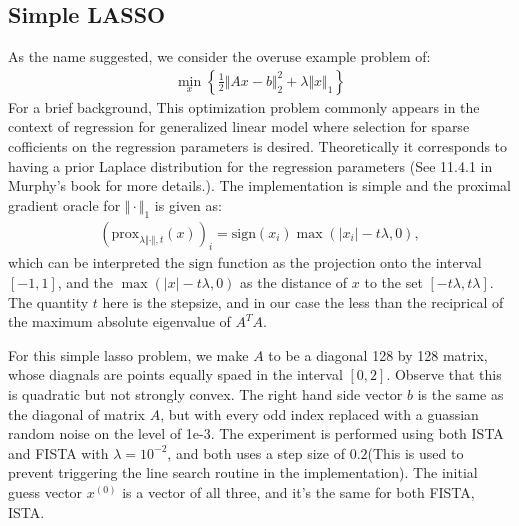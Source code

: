 \documentclass[]{article}
\theoremstyle{definition}
\begin{document}
    \subsection*{Simple LASSO}
        As the name suggested, we consider the overuse example problem of: 
        \begin{align*}
            \min_{x}\left\lbrace
                \frac{1}{2}\Vert Ax - b\Vert^2_2 + \lambda\Vert x\Vert_1    
            \right\rbrace
        \end{align*}
        For a brief background, This optimization problem commonly appears in the context of regression for generalized linear model where selection for sparse cofficients on the regression parameters is desired. Theoretically it corresponds to having a prior Laplace distribution for the regression parameters (See 11.4.1 in Murphy's\cite{book:ml_prob_murphy} book for more details.). The implementation is simple and the proximal gradient oracle for $\Vert \cdot \Vert_1$ is given as: 
        \begin{align*}
           (\text{prox}_{\lambda\Vert \cdot \Vert, t}(x))_i
           = 
           \text{sign}(x_i)\max(|x_i| - t\lambda, 0), 
        \end{align*}
        which can be interpreted the $\text{sign}$ function as the projection onto the interval $[-1, 1]$, and the $\max(|x| - t\lambda, 0)$ as the distance of $x$ to the set $[-t\lambda, t\lambda]$. The quantity $t$ here is the stepsize, and in our case the less than the reciprical of the maximum absolute eigenvalue of $A^TA$. 
        \par
        For this simple lasso problem, we make $A$ to be a diagonal 128 by 128 matrix, whose diagnals are points equally spaed in the interval $[0, 2]$. Observe that this is quadratic but not strongly convex. The right hand side vector $b$ is the same as the diagonal of matrix $A$, but with every odd index replaced with a guassian random noise on the level of 1e-3. The experiment is performed using both ISTA and FISTA with $\lambda = 10^{-2}$, and both uses a step size of $0.2$(This is used to prevent triggering the line search routine in the implementation). The initial guess vector $x^{(0)}$ is a vector of all three, and it's the same for both FISTA, ISTA. 
        \par
\end{document}

